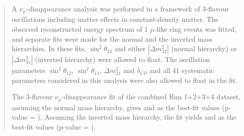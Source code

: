 \begin{frontmatter}
\begin{abstract}
A $\nu_{\mu}$-disappearance analysis was performed 
in a framework of 3-flavour oscillations including matter effects in constant-density matter.
The observed reconstructed energy spectrum of 1 $\mu$-like ring events was fitted, 
and separate fits were made for the normal and the inverted mass hierarchies. In these fits, 
$\sin^{2}\theta_{23}$ and either $|\Delta m^{2}_{32}|$ (normal hierarchy) or $|\Delta m^{2}_{31}|$ (inverted hierarchy) 
were allowed to float.
The oscillation parameters $\sin^{2}\theta_{12}$, $\sin^{2}\theta_{13}$, $\Delta m^{2}_{21}$ and $\delta_{CP}$
and all 41 systematic parameters considered in this analysis were also allowed to float in the fit.

The 3-flavour $\nu_{\mu}$-disappearance fit of the combined Run 1+2+3+4 dataset,
assuming the normal mass hierarchy,
gives
\resultNormalDmsq and \resultNormalMixing
as the best-fit values (p-value = \resultNormalPvalue).
Assuming the inverted mass hierarchy, the fit yields
\resultInvertedDmsq and \resultInvertedMixing
as the best-fit values (p-value = \resultInvertedPvalue).


\end{abstract}
\end{frontmatter}

